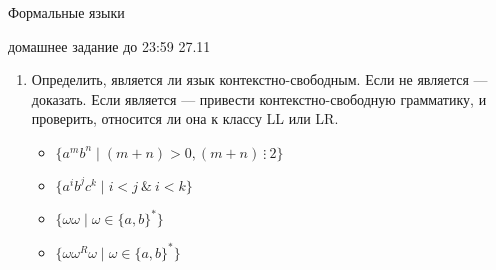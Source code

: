 \documentclass[12pt]{article}
\begin{document}
\begin{center} {\LARGE Формальные языки} \end{center}

\begin{center} \Large домашнее задание до 23:59 27.11 \end{center}
\bigskip

\begin{enumerate}
  \item Определить, является ли язык контекстно-свободным. Если не является --- доказать. Если является --- привести контекстно-свободную грамматику, и проверить, относится ли она к классу LL или LR.
  \begin{itemize}
    \item $\{ a^m b^n \mid (m + n) > 0, (m + n) \ \vdots \ 2 \}$
    \item $\{ a^i b^j c^k \mid i < j \ \& \ i < k \}$
    \item $\{ \omega \omega \mid \omega \in \{a, b\}^* \}$
    \item $\{ \omega \omega^R \omega \mid \omega \in \{a, b\}^* \}$
  \end{itemize} 
\end{enumerate}
\end{document}
